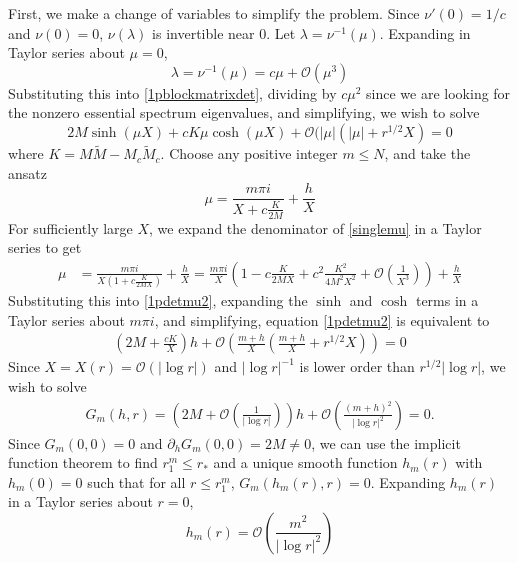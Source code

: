 \documentclass[10pt,reqno]{amsart}
\theoremstyle{plain}
\theoremstyle{definition}
\theoremstyle{remark}
\numberwithin{theorem}{section}
\numberwithin{equation}{section}
\begin{document}
First, we make a change of variables to simplify the problem. Since $\nu'(0) = 1/c$ and $\nu(0) = 0$, $\nu(\lambda)$ is invertible near 0. Let $\lambda = \nu^{-1}(\mu)$. Expanding in Taylor series about $\mu = 0$,
\begin{equation}\label{lambdamu}
\lambda = \nu^{-1}(\mu) = c \mu + \mathcal{O}(\mu^3)
\end{equation}
Substituting this into \cref{1pblockmatrixdet}, dividing by $c \mu^2$ since we are looking for the nonzero essential spectrum eigenvalues, and simplifying, we wish to solve
\begin{equation}\label{1pdetmu2}
2 M \sinh(\mu X) + c K \mu \cosh(\mu X) + \mathcal{O}(|\mu|(|\mu| + r^{1/2} X ) = 0
\end{equation}
where $K = M \tilde{M} - M_c \tilde{M}_c$. Choose any positive integer $m \leq N$, and take the ansatz
\begin{equation}\label{singlemu}
\mu = \frac{m \pi i}{X + c \frac{K}{2 M}} + \frac{h}{X}
\end{equation}
For sufficiently large $X$, we expand the denominator of \cref{singlemu} in a Taylor series to get
\begin{align}\label{singlemuTaylor}
\mu &= \frac{m \pi i}{X\left(1  + c \frac{K}{2 M X} \right) } + \frac{h}{X}
= \frac{m \pi i}{X}\left( 1 - c \frac{K}{2 M X} + c^2 \frac{K^2}{4 M^2 X^2} + \mathcal{O}\left(\frac{1}{X^3}\right) \right) + \frac{h}{X}
\end{align}
Substituting this into \cref{1pdetmu2}, expanding the $\sinh$ and $\cosh$ terms in a Taylor series about $m \pi i$, and simplifying, equation \cref{1pdetmu2} is equivalent to 
\begin{align*}
\left( 2M + \frac{cK}{X} \right)h + \mathcal{O}\left( \frac{m+h}{X}\left(\frac{m+h}{X} + r^{1/2} X \right) \right) = 0
\end{align*}
Since $X = X(r) = \mathcal{O}(|\log r|)$ and $|\log r|^{-1}$ is lower order than $r^{1/2} |\log r|$, we wish to solve
\begin{align*}
G_m(h, r) = \left( 2M + \mathcal{O}\left( \frac{1}{|\log r|} \right)\right) h + \mathcal{O}\left( \frac{(m+h)^2}{|\log r|^2} \right) = 0.
\end{align*}
Since $G_m(0,0) = 0$ and $\partial_h G_m(0,0) = 2M \neq 0$, we can use the implicit function theorem to find $r_1^m \leq r_*$ and a unique smooth function $h_m(r)$ with $h_m(0) = 0$ such that for all $r \leq r_1^m$, $G_m(h_m(r),r) = 0$. Expanding $h_m(r)$ in a Taylor series about $r = 0$,
\[
h_m(r) = \mathcal{O}\left( \frac{m^2}{|\log r|^2} \right)
\]
\end{document}
